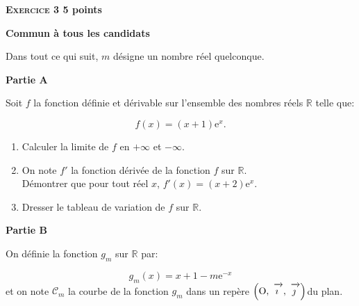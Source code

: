 \documentclass[10pt]{article}
\newcommand{\R}{\mathbb{R}}
\newcommand{\vect}[1]{\mathchoice%
{\overrightarrow{\displaystyle\mathstrut#1\,\,}}%
{\overrightarrow{\textstyle\mathstrut#1\,\,}}%
{\overrightarrow{\scriptstyle\mathstrut#1\,\,}}%
{\overrightarrow{\scriptscriptstyle\mathstrut#1\,\,}}}
\def\Oij{$\left(\text{O},~\vect{\imath},~\vect{\jmath}\right)$}
\begin{document}
\vspace{0,5cm}

\textbf{\textsc{Exercice 3} \hfill 5 points}
 
\textbf{Commun à tous les candidats}

\medskip

Dans tout ce qui suit, $m$ désigne un nombre réel quelconque.

\smallskip

\textbf{Partie A}

\smallskip

Soit $f$ la fonction définie et dérivable sur l'ensemble des nombres réels $\R$ telle que:

\[f(x) = (x + 1)\text{e}^x.\]

\begin{enumerate}
\item Calculer la limite de $f$ en $+ \infty$ et $- \infty$.
\item On note $f'$ la fonction dérivée de la fonction $f$ sur $\R$.\\
Démontrer que pour tout réel $x$, $f'(x) = (x + 2)\text{e}^x$.
\item Dresser le tableau de variation de $f$ sur $\R$.
\end{enumerate}

\smallskip

\textbf{Partie B}

\smallskip

On définie la fonction $g_m$ sur $\R$ par:

\[g_m(x) = x + 1 - m\text{e}^{-x}\]
et on note $\mathcal{C}_m$ la courbe de la fonction $g_m$ dans un repère \Oij du plan.
\end{document}

